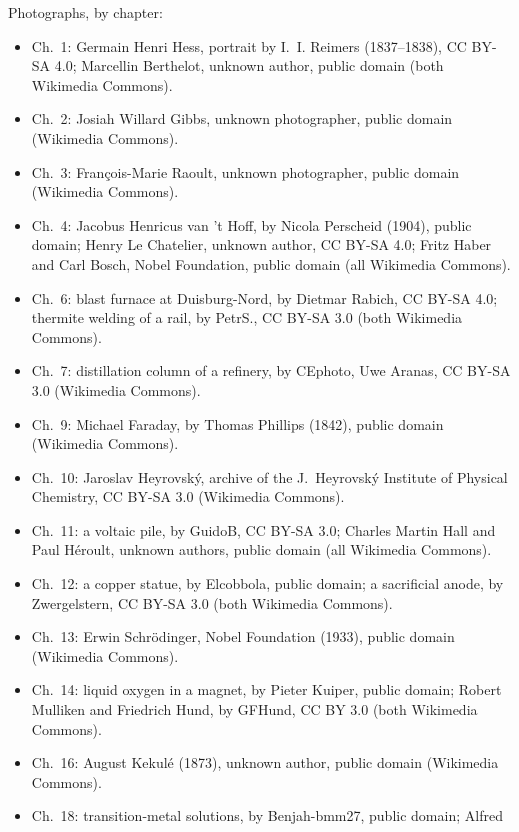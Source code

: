 \bigskip
\noindent Photographs, by chapter:
\begin{itemize}\small
  \item Ch.~1: Germain Henri Hess, portrait by I.~I. Reimers (1837--1838),
        CC BY-SA 4.0; Marcellin Berthelot, unknown author, public domain
        (both Wikimedia Commons).
  \item Ch.~2: Josiah Willard Gibbs, unknown photographer, public domain
        (Wikimedia Commons).
  \item Ch.~3: François-Marie Raoult, unknown photographer, public domain
        (Wikimedia Commons).
  \item Ch.~4: Jacobus Henricus van 't Hoff, by Nicola Perscheid (1904),
        public domain; Henry Le Chatelier, unknown author, CC BY-SA 4.0;
        Fritz Haber and Carl Bosch, Nobel Foundation, public domain (all
        Wikimedia Commons).
  \item Ch.~6: blast furnace at Duisburg-Nord, by Dietmar Rabich, CC BY-SA
        4.0; thermite welding of a rail, by PetrS., CC BY-SA 3.0 (both
        Wikimedia Commons).
  \item Ch.~7: distillation column of a refinery, by CEphoto, Uwe Aranas,
        CC BY-SA 3.0 (Wikimedia Commons).
  \item Ch.~9: Michael Faraday, by Thomas Phillips (1842), public domain
        (Wikimedia Commons).
  \item Ch.~10: Jaroslav Heyrovsk\'y, archive of the J.~Heyrovsk\'y Institute
        of Physical Chemistry, CC BY-SA 3.0 (Wikimedia Commons).
  \item Ch.~11: a voltaic pile, by GuidoB, CC BY-SA 3.0; Charles Martin Hall
        and Paul H\'eroult, unknown authors, public domain (all Wikimedia
        Commons).
  \item Ch.~12: a copper statue, by Elcobbola, public domain; a sacrificial
        anode, by Zwergelstern, CC BY-SA 3.0 (both Wikimedia Commons).
  \item Ch.~13: Erwin Schr\"odinger, Nobel Foundation (1933), public domain
        (Wikimedia Commons).
  \item Ch.~14: liquid oxygen in a magnet, by Pieter Kuiper, public domain;
        Robert Mulliken and Friedrich Hund, by GFHund, CC BY 3.0 (both Wikimedia
        Commons).
  \item Ch.~16: August Kekul\'e (1873), unknown author, public domain
        (Wikimedia Commons).
  \item Ch.~18: transition-metal solutions, by Benjah-bmm27, public domain; Alfred

\end{itemize}
